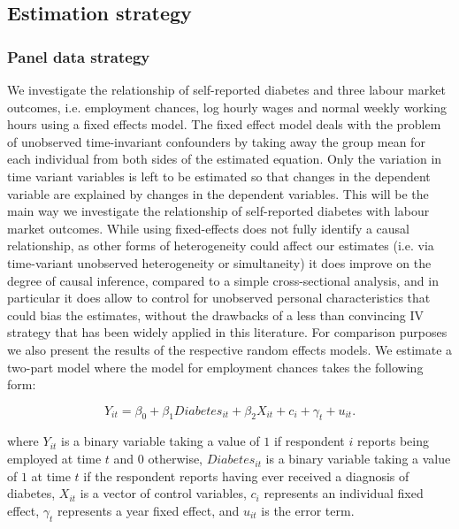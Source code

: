 \subsection{\label{sec:Estimation_Strategy}Estimation strategy}


\subsubsection{Panel data strategy}

We investigate the relationship of self-reported diabetes and three
labour market outcomes, i.e. employment chances, log hourly wages
and normal weekly working hours using a fixed effects model. The fixed
effect model deals with the problem of unobserved time-invariant confounders
by taking away the group mean for each individual from both sides
of the estimated equation. Only the variation in time variant variables
is left to be estimated so that changes in the dependent variable
are explained by changes in the dependent variables. This will be
the main way we investigate the relationship of self-reported diabetes
with labour market outcomes. While using fixed-effects does not fully
identify a causal relationship, as other forms of heterogeneity could
affect our estimates (i.e. via time-variant unobserved heterogeneity
or simultaneity) it does improve on the degree of causal inference,
compared to a simple cross-sectional analysis, and in particular it
does allow to control for unobserved personal characteristics that
could bias the estimates, without the drawbacks of a less than convincing
\ac{IV} strategy that has been widely applied in this literature. 
For comparison purposes we also present the results of the respective random effects models.
We estimate a two-part model where the model for employment chances
takes the following form:

\noindent 
\begin{equation}
Y_{it}=\beta_{0}+\beta_{1}Diabetes_{it}+\beta_{2}X_{it}+c_{i}+\gamma_{t}+u_{it}.\label{eq:employed}
\end{equation}


where $Y_{it}$ is a binary variable taking a value of $1$ if respondent
$i$ reports being employed at time $t$ and $0$ otherwise, $Diabetes_{it}$
is a binary variable taking a value of $1$ at time $t$ if the respondent
reports having ever received a diagnosis of diabetes, $X_{it}$ is
a vector of control variables, $c_{i}$ represents an individual fixed
effect, $\gamma_{t}$ represents a year fixed effect, and $u_{it}$
is the error term.

